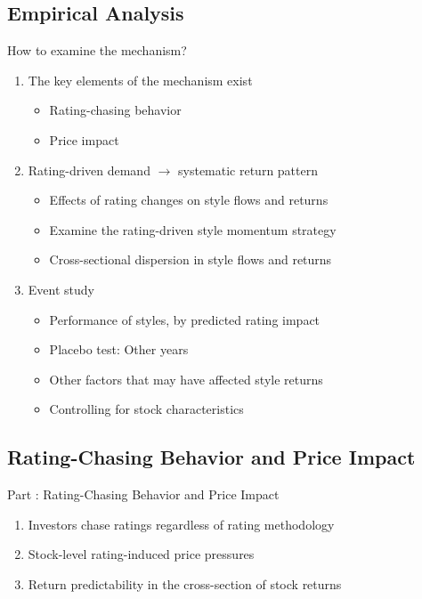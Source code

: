 \documentclass[UTF8, 16pt]{beamer}
\begin{document}
\begin{CJK*}{UTF8}{gbsn}
\section{Empirical Analysis}

\begin{frame}{How to examine the mechanism?}
	\begin{enumerate}
		\item The key elements of the mechanism exist
		\begin{itemize}
			\item Rating-chasing behavior
			\item Price impact
		\end{itemize}
		\item Rating-driven demand $\rightarrow$ systematic return pattern
		\begin{itemize}
			\item Effects of rating changes on style flows and returns
			\item Examine the rating-driven style momentum strategy
			\item Cross-sectional dispersion in style flows and returns
		\end{itemize}
		\item Event study
		\begin{itemize}
			\item Performance of styles, by predicted rating impact
			\item Placebo test: Other years
			\item Other factors that may have affected style returns
			\item Controlling for stock characteristics
		\end{itemize} 
	\end{enumerate}
\end{frame}

\subsection{Rating-Chasing Behavior and Price Impact}

\begin{frame}{Part \uppercase\expandafter{}: Rating-Chasing Behavior and Price Impact}
	 \begin{enumerate}
	 	\item Investors chase ratings regardless of rating methodology
	 	\item Stock-level rating-induced price pressures
	 	\item Return predictability in the cross-section of stock returns
	 \end{enumerate}
\end{frame}


\end{CJK*}
\end{document}
